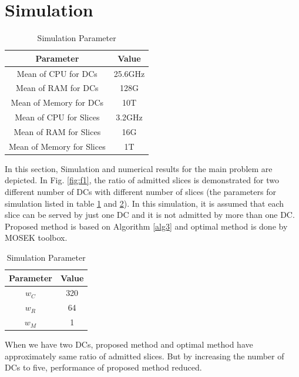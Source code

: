 \documentclass[conference]{IEEEtran}
\begin{document}
\section{Simulation}
 \begin{table}[H]
 \caption {Simulation Parameter} \label{table:1} 
 \begin{center}
  \begin{tabular}{||c c ||} 
  \hline
  Parameter & Value \\ [0.5ex] 
  \hline\hline
  Mean of CPU for DCs & 25.6GHz\\
  \hline
  Mean of RAM for DCs & 128G\\
  \hline
 Mean of Memory for DCs & 10T \\
  \hline
   Mean of CPU for Slices & 3.2GHz\\
  \hline
  Mean of RAM for Slices & 16G\\
  \hline
 Mean of Memory for Slices & 1T \\ [1ex] 
  \hline
 \end{tabular}
 \end{center}
 \end{table}
In this section, Simulation and numerical results for the main problem are depicted.
In Fig. \ref{fig:f1}, the ratio of admitted slices is demonstrated for two different number of DCs with different number of slices (the parameters for simulation listed in table \ref{table:1} and \ref{table:2}). In this simulation, it is assumed that each slice can be served by just one DC and it is not admitted by more than one DC. Proposed method is based on Algorithm \ref{alg3} and optimal method is done by MOSEK toolbox. 
 \begin{table}[H]
 \caption {Simulation Parameter} \label{table:2} 
 \begin{center}
  \begin{tabular}{||c c ||} 
  \hline
  Parameter & Value \\ [0.5ex] 
  \hline\hline
   $w_C$ & 320\\
  \hline
  $w_R$  & 64\\
  \hline
 $w_M$  & 1 \\ [1ex] 
  \hline
 \end{tabular}
 \end{center}
 \end{table}
When we have two DCs, proposed method and optimal method have approximately same ratio of admitted slices. But by increasing the number of DCs to five, performance of proposed method reduced.
\end{document}
